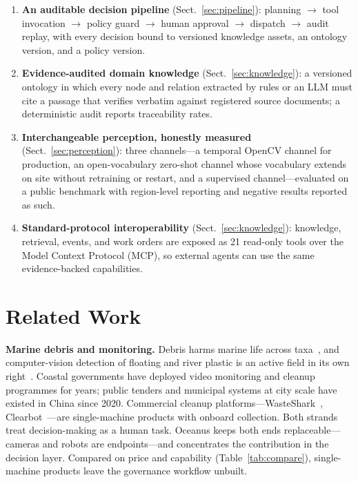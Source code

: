 \documentclass[conference]{IEEEtran}
\begin{document}
\begin{enumerate}
\item \textbf{An auditable decision pipeline}
(Sect.~\ref{sec:pipeline}): planning $\to$ tool invocation $\to$ policy
guard $\to$ human approval $\to$ dispatch $\to$ audit replay, with every
decision bound to versioned knowledge assets, an ontology version, and a
policy version.
\item \textbf{Evidence-audited domain knowledge} (Sect.~\ref{sec:knowledge}):
a versioned ontology in which every node and relation extracted by rules or
an LLM must cite a passage that verifies verbatim against registered source
documents; a deterministic audit reports traceability rates.
\item \textbf{Interchangeable perception, honestly measured}
(Sect.~\ref{sec:perception}): three channels---a temporal OpenCV channel for
production, an open-vocabulary zero-shot channel whose vocabulary extends on
site without retraining or restart, and a supervised channel---evaluated on a
public benchmark with region-level reporting and negative results reported
as such.
\item \textbf{Standard-protocol interoperability} (Sect.~\ref{sec:knowledge}):
knowledge, retrieval, events, and work orders are exposed as 21 read-only
tools over the Model Context Protocol (MCP), so external agents can use the
same evidence-backed capabilities.
\end{enumerate}

\section{Related Work}
\textbf{Marine debris and monitoring.} Debris harms marine life across
taxa~\cite{gall2015}, and computer-vision detection of floating and river
plastic is an active field in its own right~\cite{maharjan2022}. Coastal
governments have deployed video
monitoring and cleanup programmes for years; public tenders and municipal
systems at city scale have existed in China since 2020. Commercial cleanup
platforms---WasteShark~\cite{wasteshark}, Clearbot~\cite{clearbot}---are
single-machine products with onboard collection. Both strands treat
decision-making as a human task. Oceanus keeps both ends replaceable---
cameras and robots are endpoints---and concentrates the contribution in
the decision layer. Compared on price and capability
(Table~\ref{tab:compare}), single-machine products leave the governance
workflow unbuilt.
\end{document}
